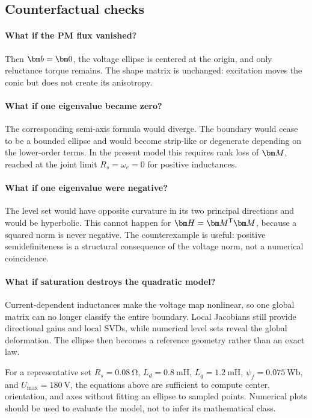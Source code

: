 \subsection{Counterfactual checks}

\paragraph{What if the PM flux vanished?}
Then $\vect b=\vect0$, the voltage ellipse is centered at the origin, and only
reluctance torque remains.  The shape matrix is unchanged: excitation moves
the conic but does not create its anisotropy.

\paragraph{What if one eigenvalue became zero?}
The corresponding semi-axis formula would diverge.  The boundary would cease
to be a bounded ellipse and would become strip-like or degenerate depending on
the lower-order terms.  In the present model this requires rank loss of
$\Apsm$, reached at the joint limit $R_s=\omega_e=0$ for positive
inductances.

\paragraph{What if one eigenvalue were negative?}
The level set would have opposite curvature in its two principal directions
and would be hyperbolic.  This cannot happen for
$\Hpsm=\Apsm\trans\Apsm$, because a squared norm is never negative.  The
counterexample is useful: positive semidefiniteness is a structural consequence
of the voltage norm, not a numerical coincidence.

\paragraph{What if saturation destroys the quadratic model?}
Current-dependent inductances make the voltage map nonlinear, so one global
matrix can no longer classify the entire boundary.  Local Jacobians still
provide directional gains and local SVDs, while numerical level sets reveal
the global deformation.  The ellipse then becomes a reference geometry rather
than an exact law.



For a representative set $R_s=\SI{0.08}{\ohm}$,
$L_d=\SI{0.8}{\milli\henry}$, $L_q=\SI{1.2}{\milli\henry}$,
$\psi_f=\SI{0.075}{\weber}$, and $U_{\max}=\SI{180}{\volt}$, the equations
above are sufficient to compute center, orientation, and axes without fitting
an ellipse to sampled points.  Numerical plots should be used to evaluate the
model, not to infer its mathematical class.

